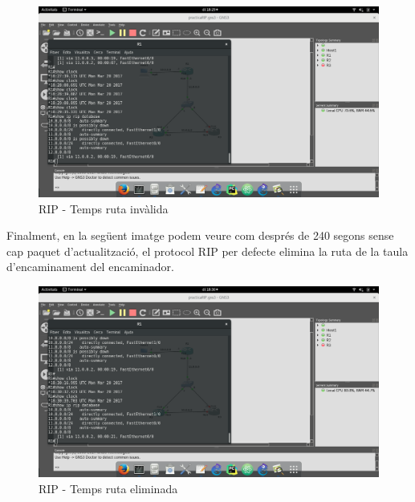\documentclass[10pt]{article}
\begin{document}
\begin{figure}[H]
\begin{center}
\includegraphics[scale=0.3]{Images/RIP-invalid2.png}
\caption{RIP - Temps ruta invàlida}
\end{center}
\end{figure}
Finalment, en la següent imatge podem veure com després de 240 segons sense cap paquet d'actualització, el protocol RIP per defecte elimina la ruta de la taula d'encaminament del encaminador.
\begin{figure}[H]
\begin{center}
\includegraphics[scale=0.3]{Images/RIP-flush.png}
\caption{RIP - Temps ruta eliminada}
\end{center}
\end{figure}
\end{document}
